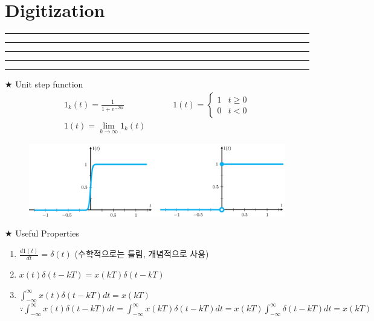 \setcounter{chapter}{7}
\setcounter{section}{0}
\section{Digitization}
\vspace{-8pt} \hrule \hrule \hrule \hrule \hrule  \vspace{12pt}

$\bigstar$ Unit step function
\begin{align*}
	1_k(t) = \frac{1}{1+e^{-2kt}}&&&& 1(t) = \begin{cases}1 & t \geq 0 \\0 & t< 0\end{cases}\\
	1(t) = \lim_{k \rightarrow \infty} 1_k(t) 
\end{align*}


	    \begin{figure}[!h]
	        \centering
	        \includegraphics[width=18cm]{./FIG_Franklin/fig8-smc2_2.png}
	    \end{figure}


$\bigstar$ Useful Properties
 \begin{enumerate}
 	\item $\frac{d1(t)}{dt} = \delta(t) $ (수학적으로는 틀림, 개념적으로 사용)
 	\item $x(t)\delta(t-kT) = x(kT)\delta(t-kT)$
 	\item $\int_{-\infty}^{\infty} x(t) \delta(t-kT) dt= x(kT)$\\
		$ \because \int_{-\infty}^{\infty} x(t) \delta(t-kT)dt =\int_{-\infty}^{\infty} x(kT) \delta(t-kT) dt=x(kT)\int_{-\infty}^{\infty} \delta(t-kT) dt=x(kT)$
 	
 
 \end{enumerate}


